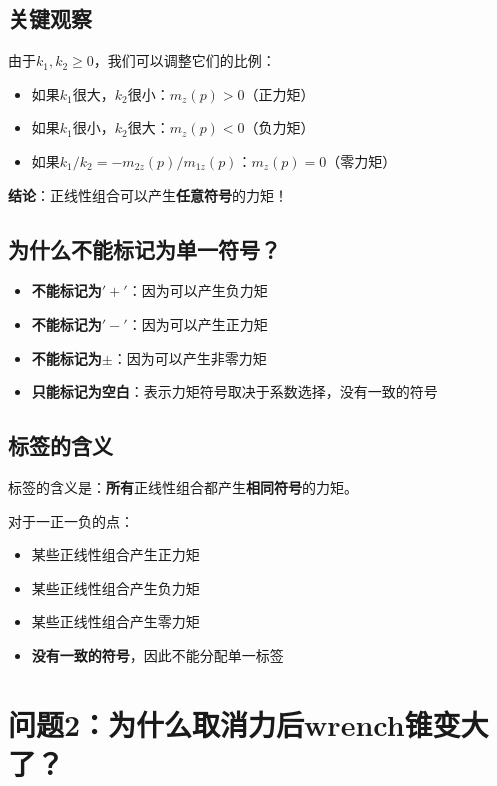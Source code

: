 \documentclass[12pt,a4paper]{article}
\begin{document}
\subsection{关键观察}

由于$k_1, k_2 \geq 0$，我们可以调整它们的比例：

\begin{itemize}
    \item 如果$k_1$很大，$k_2$很小：$m_z(p) > 0$（正力矩）
    \item 如果$k_1$很小，$k_2$很大：$m_z(p) < 0$（负力矩）
    \item 如果$k_1 / k_2 = -m_{2z}(p) / m_{1z}(p)$：$m_z(p) = 0$（零力矩）
\end{itemize}

\textbf{结论}：正线性组合可以产生\textbf{任意符号}的力矩！

\subsection{为什么不能标记为单一符号？}

\begin{itemize}
    \item \textbf{不能标记为$'+'$}：因为可以产生负力矩
    \item \textbf{不能标记为$'-'$}：因为可以产生正力矩
    \item \textbf{不能标记为$\pm$}：因为可以产生非零力矩
    \item \textbf{只能标记为空白}：表示力矩符号取决于系数选择，没有一致的符号
\end{itemize}

\subsection{标签的含义}

标签的含义是：\textbf{所有}正线性组合都产生\textbf{相同符号}的力矩。

对于一正一负的点：
\begin{itemize}
    \item 某些正线性组合产生正力矩
    \item 某些正线性组合产生负力矩
    \item 某些正线性组合产生零力矩
    \item \textbf{没有一致的符号}，因此不能分配单一标签
\end{itemize}

\section{问题2：为什么取消力后wrench锥变大了？}
\end{document}
